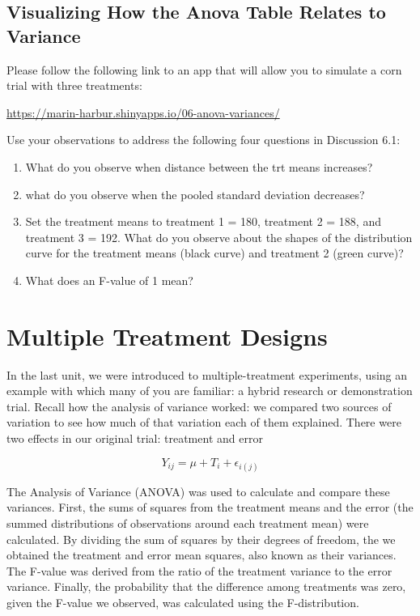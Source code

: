 \documentclass[
]{book}
\providecommand{\tightlist}{%
  \setlength{\itemsep}{0pt}\setlength{\parskip}{0pt}}
\begin{document}
\hypertarget{visualizing-how-the-anova-table-relates-to-variance}{%
\section{Visualizing How the Anova Table Relates to Variance}\label{visualizing-how-the-anova-table-relates-to-variance}}

Please follow the following link to an app that will allow you to simulate a corn trial with three treatments:

\url{https://marin-harbur.shinyapps.io/06-anova-variances/}

Use your observations to address the following four questions in Discussion 6.1:

\begin{enumerate}
\def\labelenumi{\arabic{enumi})}
\tightlist
\item
  What do you observe when distance between the trt means increases?
\item
  what do you observe when the pooled standard deviation decreases?
\item
  Set the treatment means to treatment 1 = 180, treatment 2 = 188, and treatment 3 = 192. What do you observe about the shapes of the distribution curve for the treatment means (black curve) and treatment 2 (green curve)?
\item
  What does an F-value of 1 mean?
\end{enumerate}

\hypertarget{multiple-treatment-designs}{%
\chapter{Multiple Treatment Designs}\label{multiple-treatment-designs}}

In the last unit, we were introduced to multiple-treatment experiments, using an example with which many of you are familiar: a hybrid research or demonstration trial. Recall how the analysis of variance worked: we compared two sources of variation to see how much of that variation each of them explained. There were two effects in our original trial: treatment and error

\[ Y_{ij}=\mu + T_i + \epsilon_{i(j)}\]

The Analysis of Variance (ANOVA) was used to calculate and compare these variances. First, the sums of squares from the treatment means and the error (the summed distributions of observations around each treatment mean) were calculated. By dividing the sum of squares by their degrees of freedom, the we obtained the treatment and error mean squares, also known as their variances. The F-value was derived from the ratio of the treatment variance to the error variance. Finally, the probability that the difference among treatments was zero, given the F-value we observed, was calculated using the F-distribution.
\end{document}
